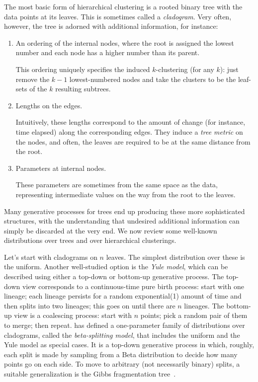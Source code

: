 The most basic form of hierarchical clustering is a rooted binary tree with the data points at its leaves. This is sometimes called a {\it cladogram}. Very often, however, the tree is adorned with additional information, for instance:
\begin{enumerate}
\item An ordering of the internal nodes, where the root is assigned the lowest number and each node has a higher number than its parent.

This ordering uniquely specifies the induced $k$-clustering (for any $k$): just remove the $k-1$ lowest-numbered nodes and take the clusters to be the leaf-sets of the $k$ resulting subtrees.

\item Lengths on the edges.

Intuitively, these lengths correspond to the amount of change (for instance, time elapsed) along the corresponding edges. They induce a {\it tree metric} on the nodes, and often, the leaves are required to be at the same distance from the root.

\item Parameters at internal nodes.

These parameters are sometimes from the same space as the data, representing intermediate values on the way from the root to the leaves.
\end{enumerate}
Many generative processes for trees end up producing these more sophisticated structures, with the understanding that undesired additional information can simply be discarded at the very end. We now review some well-known distributions over trees and over hierarchical clusterings.

Let's start with cladograms on $n$ leaves. The simplest distribution over these is the uniform. Another well-studied option is the {\it Yule model}, which can be described using either a top-down or bottom-up generative process. The top-down view corresponds to a continuous-time pure birth process: start with one lineage; each lineage persists for a random exponential(1) amount of time and then splits into two lineages; this goes on until there are $n$ lineages. The bottom-up view is a coalescing process: start with $n$ points; pick a random pair of them to merge; then repeat. \citet{A95} has defined a one-parameter family of distributions over cladograms, called the {\it beta-splitting model}, that includes the uniform and the Yule model as special cases. It is a top-down generative process in which, roughly, each split is made by sampling from a Beta distribution to decide how many points go on each side. To move to arbitrary (not necessarily binary) splits, a suitable generalization is the Gibbs fragmentation tree~\cite{MPW08}.

